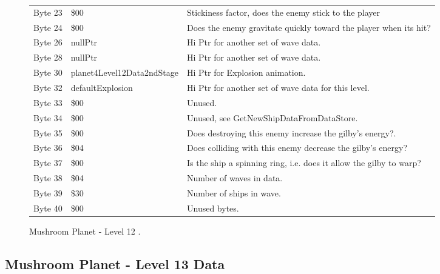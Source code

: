 \begin{figure}[H]
{\begin{adjustbox}{width=12cm}
\begin{tabular}{lll}
 Byte 23 & \$00                        & Stickiness factor, does the enemy stick to the player              \\
 Byte 24 & \$00                        & Does the enemy gravitate quickly toward the player when its hit?   \\
 Byte 26 & nullPtr                    & Hi Ptr for another set of wave data.                               \\
 Byte 28 & nullPtr                    & Hi Ptr for another set of wave data.                               \\
 Byte 30 & planet4Level12Data2ndStage & Hi Ptr for Explosion animation.                                    \\
 Byte 32 & defaultExplosion           & Hi Ptr for another set of wave data for this level.                \\
 Byte 33 & \$00                        & Unused.                                                            \\
 Byte 34 & \$00                        & Unused, see GetNewShipDataFromDataStore.                           \\
 Byte 35 & \$00                        & Does destroying this enemy increase the gilby's energy?.           \\
 Byte 36 & \$04                        & Does colliding with this enemy decrease the gilby's energy?        \\
 Byte 37 & \$00                        & Is the ship a spinning ring, i.e. does it allow the gilby to warp? \\
 Byte 38 & \$04                        & Number of waves in data.                                           \\
 Byte 39 & \$30                        & Number of ships in wave.                                           \\
 Byte 40 & \$00                        & Unused bytes.                                                      \\
\bottomrule
\end{tabular}

  \end{adjustbox}

  }\caption*{Mushroom Planet - Level 12
.}
\end{figure}

\clearpage
\subsection{Mushroom Planet - Level 13 Data}

